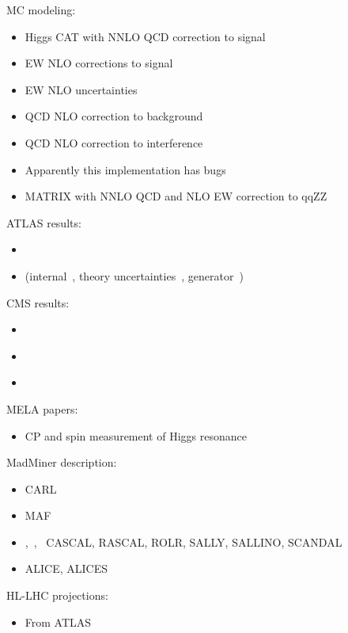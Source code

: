 \documentclass[11pt,letterpaper]{article}
\begin{document}
MC modeling:
\begin{itemize}
  \item \cite{Passarino:2013bha} Higgs CAT with NNLO QCD correction to signal
  \item \cite{Biedermann:2016yvs} EW NLO corrections to signal
  \item \cite{Gieseke:2014gkab} EW NLO uncertainties
  \item \cite{Caola:2015psa} QCD NLO correction to background
  \item \cite{Caola:2016trd} QCD NLO correction to interference
  \item \cite{Alioli:2016xab} Apparently this implementation has bugs
  \item \cite{Kallweit:2019zez} MATRIX with NNLO QCD and NLO EW correction to qqZZ
\end{itemize}

ATLAS results:
\begin{itemize}
  \item \cite{Aad:2015xua}
  \item \cite{Aaboud:2018puo} (internal~\cite{Abidi:2231604}, theory uncertainties~\cite{Meyer:2232040}, generator~\cite{ATL-PHYS-PUB-2017-005})
\end{itemize}

CMS results:
\begin{itemize}
  \item \cite{Khachatryan:2014iha}
  \item \cite{Khachatryan:2016ctc}
  \item \cite{Sirunyan:2019twz}
\end{itemize}

MELA papers:
\begin{itemize}
  \item \cite{Bolognesi:2012mm} CP and spin measurement of Higgs resonance
\end{itemize}

MadMiner description:
\begin{itemize}
  \item \cite{Cranmer:2015bka} CARL
  \item \cite{papamakarios2017masked} MAF
  \item \cite{Brehmer:2018kdj},~\cite{Brehmer:2018hga},~\cite{Brehmer:2018eca}  CASCAL, RASCAL, ROLR, SALLY, SALLINO, SCANDAL
  \item \cite{Stoye:2018ovl} ALICE, ALICES
\end{itemize}

HL-LHC projections:
\begin{itemize}
  \item \cite{ATL-PHYS-PUB-2015-024} From ATLAS
\end{itemize}



\end{document}
